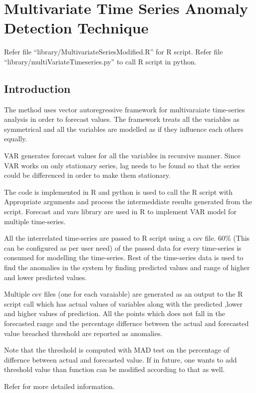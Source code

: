 \chapter{Multivariate Time Series Anomaly Detection Technique}

Refer file ``library/MultivariateSeriesModified.R'' for R script. Refer file ``library/multiVariateTimeseries.py'' to call R script in python.

\section{Introduction}

The method uses vector autoregressive framework for multivaraiate time-series analysis
in order to forecast values. The framework treats all the variables as symmetrical
and all the variables are modelled as if they influence each others equally.

VAR generates forecast values for all the variables in recursive manner. Since VAR 
works on only stationary series, lag needs to be found so that the series could be
differenced in order to make them stationary.

The code is implemented in R and python is used to call the R script with Appropriate 
arguments and process the intermeddiate results generated from the script. Forecast and 
vars library are used in R to implement VAR model for multiple time-series.

All the interrelated time-series are passed to R script using a csv file. 60\% 
(This can be configured as per user need) of the passed data for every time-series 
is consumed for modelling the time-series. Rest of the time-series data is used to 
find the anomalies in the system by finding predicted values and range of higher and lower
predicted values.

Multiple csv files (one for each varaiable) are generated as an output to the R script 
call which has actual values of variables along with the predicted ,lower and higher 
values of prediction. All the points which does not fall in the forecasted range and 
the percentage differnce between the actual and forecasted value breached threshold 
are reported as anomalies.

Note that the threshold is computed with MAD test on the percentage of differnce between actual and forecasted value.
If in future, one wants to add threshold value than function can be modified according to that as well.

Refer \cite{var} for more detailed information.

